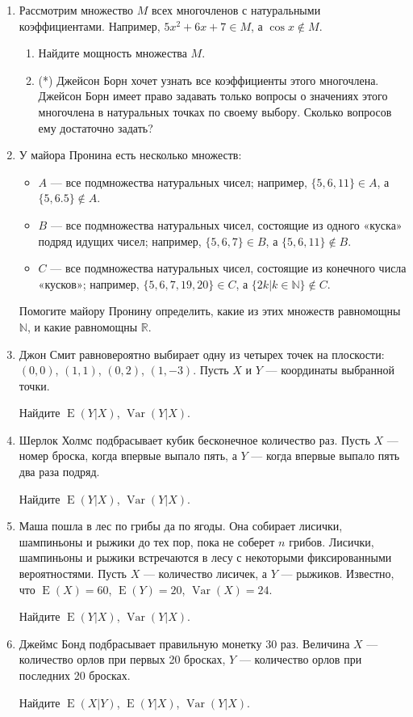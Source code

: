 \documentclass[12pt]{article}
\DeclareMathOperator{\Var}{Var}
\DeclareMathOperator{\E}{E}
\begin{document}
\begin{enumerate}

\item Рассмотрим множество $M$ всех многочленов с натуральными коэффициентами. Например, $5x^2+6x+7 \in M$, а $\cos x \notin M$.
\begin{enumerate}
  \item Найдите мощность множества $M$.
  \item (*) Джейсон Борн хочет узнать все коэффициенты этого многочлена. Джейсон Борн имеет право задавать только вопросы о значениях этого многочлена в натуральных точках по своему выбору. Сколько вопросов ему достаточно задать?
\end{enumerate}

\item У майора Пронина есть несколько множеств:

\begin{itemize}
\item $A$ — все подмножества натуральных чисел; например, $\{5, 6, 11\} \in A$, а $\{5, 6.5\} \notin A$.
\item $B$ — все подмножества натуральных чисел, состоящие из одного «куска» подряд идущих чисел; например, $\{5, 6, 7\} \in B$, а $\{5, 6, 11\} \notin B$.
\item $C$ — все подмножества натуральных чисел, состоящие из конечного числа «кусков»; например, $\{5, 6, 7, 19, 20\} \in C$, а $\{2k | k \in \mathbb{N}\} \notin C$.
\end{itemize}

Помогите майору Пронину определить, какие из этих множеств равномощны $\mathbb{N}$, и какие равномощны $\mathbb{R}$.

\item Джон Смит равновероятно выбирает одну из четырех точек на плоскости: $(0, 0)$, $(1, 1)$, $(0, 2)$, $(1, -3)$. Пусть $X$ и $Y$ — координаты выбранной точки.

Найдите $\E(Y|X)$, $\Var(Y|X)$.

\item Шерлок Холмс подбрасывает кубик бесконечное количество раз. Пусть $X$ — номер броска, когда впервые выпало пять, а $Y$ — когда впервые выпало пять два раза подряд.

Найдите $\E(Y|X)$, $\Var(Y|X)$.

\item Маша пошла в лес по грибы да по ягоды. Она собирает лисички, шампиньоны и рыжики до тех пор, пока не соберет $n$ грибов. Лисички, шампиньоны и рыжики встречаются в лесу с некоторыми фиксированными вероятностями. Пусть $X$ — количество лисичек, а $Y$ — рыжиков. Известно, что $\E(X)=60$, $\E(Y)=20$, $\Var(X)=24$.

Найдите $\E(Y|X)$, $\Var(Y|X)$.

\item Джеймс Бонд подбрасывает правильную монетку 30 раз. Величина $X$ — количество орлов при первых 20 бросках, $Y$ — количество орлов при последних 20 бросках.

Найдите $\E(X|Y)$, $\E(Y|X)$, $\Var(Y|X)$.

\end{enumerate}
\end{document}
